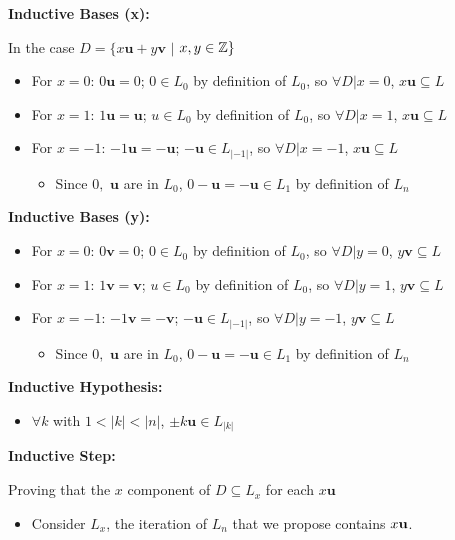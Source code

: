 \documentclass[11pt]{article}
\begin{document}
\begin{solution}[1]
\item
\textbf{Inductive Bases (x):} 
\item In the case $D = \{x\textbf{u} + y\textbf{v}$ $|$ $x, y \in \Z\}$
\begin{itemize}
\item For $x = 0$: $0\textbf{u} = 0$; $0 \in L_0$ by definition of $L_0$, so $\forall D| x = 0$, $x\textbf{u} \subseteq L$
\item For $x = 1$: $1\textbf{u} = \textbf{u}$; $u \in L_0$ by definition of $L_0$, so $\forall D| x = 1$, $x\textbf{u} \subseteq L$
\item For $x = -1$: $-1\textbf{u} = -\textbf{u}$; $-\textbf{u} \in L_{|-1|}$, so $\forall D| x = -1$, $x\textbf{u} \subseteq L$
\begin{itemize}
\item Since $0,$ $\textbf{u}$ are in $L_0$, $0-\textbf{u} = -\textbf{u} \in L_1$ by definition of $L_n$
\end{itemize} 
\end{itemize}
\textbf{Inductive Bases (y):} 
\begin{itemize}
\item For $x = 0$: $0\textbf{v} = 0$; $0 \in L_0$ by definition of $L_0$, so $\forall D| y = 0$, $y\textbf{v} \subseteq L$
\item For $x = 1$: $1\textbf{v} = \textbf{v}$; $u \in L_0$ by definition of $L_0$, so $\forall D| y = 1$, $y\textbf{v} \subseteq L$
\item For $x = -1$: $-1\textbf{v} = -\textbf{v}$; $-\textbf{u} \in L_{|-1|}$, so $\forall D| y = -1$, $y\textbf{v} \subseteq L$
\begin{itemize}
\item Since $0,$ $\textbf{u}$ are in $L_0$, $0-\textbf{u} = -\textbf{u} \in L_1$ by definition of $L_n$
\end{itemize} 
\end{itemize}
\textbf{Inductive Hypothesis:}
\begin{itemize}
\item $\forall k$ with $ 1 < |k| < |n|$, $\pm k\textbf{u} \in L_{|k|}$
\end{itemize}
\textbf{Inductive Step:}
\item Proving that the $x$ component of $D \subseteq L_x$ for each $x\textbf{u}$
\begin{itemize}
\item Consider $L_x$, the iteration of $L_n$ that we propose contains $x{\bf u}$. 
\begin{center} 

\end{center}
\end{itemize}
\end{solution}
\end{document}
